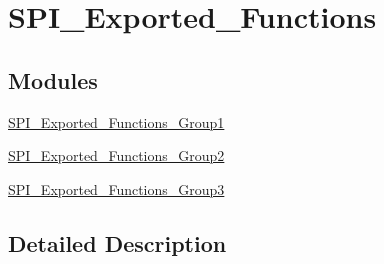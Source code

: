 \hypertarget{group___s_p_i___exported___functions}{}\section{S\+P\+I\+\_\+\+Exported\+\_\+\+Functions}
\label{group___s_p_i___exported___functions}
\subsection*{Modules}
\begin{DoxyCompactItemize}
\item 
\hyperlink{group___s_p_i___exported___functions___group1}{S\+P\+I\+\_\+\+Exported\+\_\+\+Functions\+\_\+\+Group1}
\item 
\hyperlink{group___s_p_i___exported___functions___group2}{S\+P\+I\+\_\+\+Exported\+\_\+\+Functions\+\_\+\+Group2}
\item 
\hyperlink{group___s_p_i___exported___functions___group3}{S\+P\+I\+\_\+\+Exported\+\_\+\+Functions\+\_\+\+Group3}
\end{DoxyCompactItemize}


\subsection{Detailed Description}
